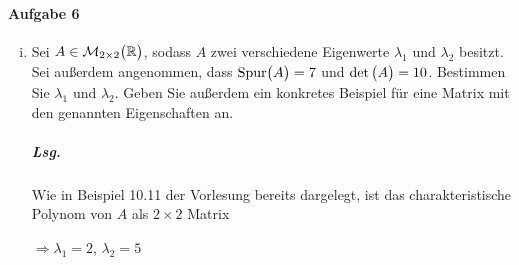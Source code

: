 \documentclass{scrreprt}
\newcommand{\Spur}{\text{Spur}}
\begin{document}
\paragraph{Aufgabe 6}
\begin{enumerate}[(i)]
\item Sei $A \in \mathcal{M}_{2 \times 2}\qty\big(\mathbb{R})$, sodass $A$
  zwei verschiedene Eigenwerte $\lambda_1$ und $\lambda_2$ besitzt.
  Sei außerdem angenommen, dass $\Spur\qty\big(A) = 7$ und
  $\det\qty\big(A) = 10$.
  Bestimmen Sie $\lambda_1$ und $\lambda_2$.
  Geben Sie außerdem ein konkretes Beispiel für eine Matrix mit den genannten
  Eigenschaften an.

  \subparagraph{Lsg.} Wie in Beispiel 10.11 der Vorlesung bereits dargelegt, ist
  das charakteristische Polynom von $A$ als $2 \times 2$ Matrix
  $\Rightarrow \lambda_1 = 2$, $\lambda_2 = 5$


\end{enumerate}
\end{document}
